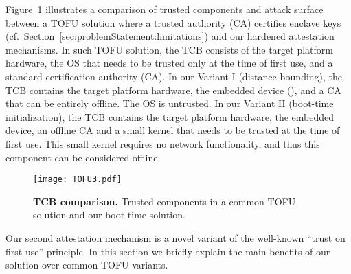 Figure~\ref{fig:TOFU} illustrates a comparison of trusted components and attack surface between a TOFU solution where a trusted authority (CA) certifies enclave keys (cf.~Section~\ref{sec:problemStatement:limitations}) and our hardened attestation mechanisms. In such TOFU solution, the TCB consists of the target platform hardware, the OS that needs to be trusted only at the time of first use, and a standard certification authority (CA). In our Variant I (distance-bounding), the TCB contains the target platform hardware, the embedded device (\device), and a CA that can be entirely offline. The OS is untrusted. In our Variant II (boot-time initialization), the TCB contains the target platform hardware, the embedded device, an offline CA and a small kernel that needs to be trusted at the time of first use. This small kernel requires no network functionality, and thus this component can be considered offline.
\fi

\begin{figure}[t]
 \centering
  \texttt{[image: TOFU3.pdf]}
 \caption{\textbf{TCB comparison.} Trusted components in a common TOFU solution and our boot-time solution.}
 \figsaver
 \label{fig:TOFU}
\end{figure}



 Our second attestation mechanism is a novel variant of the well-known ``trust on first use'' principle. In this section we briefly explain the main benefits of our solution over common TOFU variants. 

